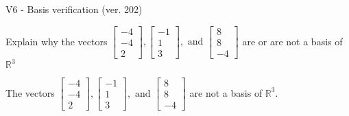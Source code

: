 \begin{exercise}
  \begin{exerciseTitle}V6 - Basis verification (ver. 202)\end{exerciseTitle}
  \begin{exerciseStatement}
    Explain why the vectors \(\left[\begin{array}{r}
-4 \\
-4 \\
2
\end{array}\right] , \left[\begin{array}{r}
-1 \\
1 \\
3
\end{array}\right] , \text{ and } \left[\begin{array}{r}
8 \\
8 \\
-4
\end{array}\right]\) are or are not a basis of \(\mathbb{R}^3\)	


  \end{exerciseStatement}
  \begin{exerciseAnswer}
   The vectors \(\left[\begin{array}{r}
-4 \\
-4 \\
2
\end{array}\right] , \left[\begin{array}{r}
-1 \\
1 \\
3
\end{array}\right] , \text{ and } \left[\begin{array}{r}
8 \\
8 \\
-4
\end{array}\right]\) 
  	 are not  a basis of \(\mathbb{R}^3\).
  


  \end{exerciseAnswer}
\end{exercise}